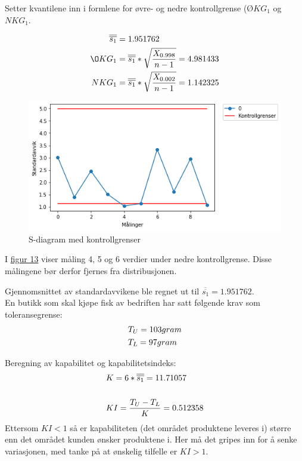 \documentclass[12pt]{article}
\begin{document}
Setter kvantilene inn i formlene for øvre- og nedre kontrollgrense ($ØKG_1$ og $NKG_1$.\cite{2}

\begin{equation}
    \centering
\begin{aligned}
\overline{\overline{s_1}} & = 1.951762\\
ØKG_1 & = \overline{\overline{s_1}}*\sqrt{\frac{X_{0.998}}{n-1}}= 4.981433\\
NKG_1 & = \overline{\overline{s_1}}*\sqrt{\frac{X_{0.002}}{n-1}}= 1.142325
\end{aligned}
\end{equation}

\begin{figure}[H]
    \centering
    \includegraphics[scale = 0.85]{s_diagram.png}
    \caption{S-diagram med kontrollgrenser}
    \label{fig:fig13}
\end{figure}
I \hyperref[fig:fig13]{figur 13} viser måling 4, 5 og 6 verdier under nedre kontrollgrense. Disse målingene bør derfor fjernes fra distribusjonen.

Gjennomsnittet av standardavvikene ble regnet ut til $\overline{\overline{s_1}}=1.951762$.\\

En butikk som skal kjøpe fisk av bedriften har satt følgende krav som toleransegrense:
\begin{equation}
\begin{aligned}
\centering
&T_U = 103  gram\\
&T_L = 97  gram 
\end{aligned}
\end{equation}

Beregning av kapabilitet og kapabilitetsindeks:
\begin{equation}
\begin{aligned}
 \centering
  &K = 6*\overline{\overline{s_1}}=11.71057\\\\
  &KI = \frac{T_U-T_L}{K}=0.512358\\
\end{aligned}
\end{equation}
Ettersom $KI < 1$ så er kapabiliteten (det området produktene leveres i) større enn det området kunden ønsker produktene i.
Her må det gripes inn for å senke variasjonen, med tanke på at ønskelig tilfelle er $KI > 1$.\cite{3}
\end{document}
